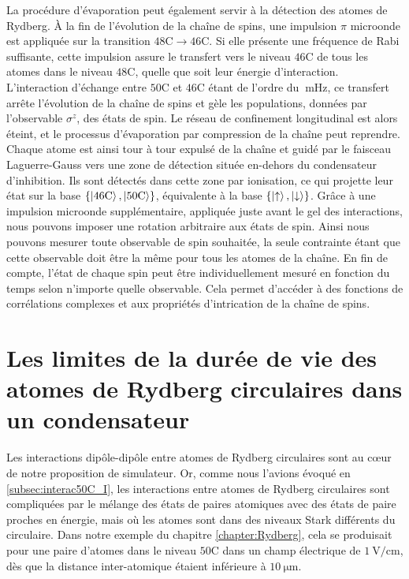 La procédure d'évaporation peut également servir à la détection des atomes de Rydberg.
\`A la fin de l'évolution de la chaîne de spins, une impulsion $\pi$ microonde est appliquée sur la transition $\mathrm{48C}\rightarrow\mathrm{46C}$.
Si elle présente une fréquence de Rabi suffisante, cette impulsion assure le transfert vers le niveau $\mathrm{46C}$ de tous les atomes dans le niveau $\mathrm{48C}$, quelle que soit leur énergie d'interaction.
L'interaction d'échange entre $\mathrm{50C}$ et $\mathrm{46C}$ étant de l'ordre du $\SI{}{\milli\hertz}$, ce transfert arrête l'évolution de la chaîne de spins et \og gèle \fg{} les populations, données par l'observable $\sigma^z$, des états de spin.
Le réseau de confinement longitudinal est alors éteint, et le processus d'évaporation par compression de la chaîne peut reprendre.
Chaque atome est ainsi tour à tour expulsé de la chaîne et guidé par le faisceau Laguerre-Gauss vers une zone de détection située en-dehors du condensateur d'inhibition.
Ils sont détectés dans cette zone par ionisation, ce qui projette leur état sur la base $\{\ket{\mathrm{46C}},\ket{\mathrm{50C}}\}$, équivalente à la base $\{\ket{\uparrow},\ket{\downarrow} \}$.
Grâce à une impulsion microonde supplémentaire, appliquée juste avant le gel des interactions, nous pouvons imposer une rotation arbitraire aux états de spin. Ainsi nous pouvons mesurer toute observable de spin souhaitée, la seule contrainte étant que cette observable doit être la même pour tous les atomes de la chaîne.
En fin de compte, l'état de chaque spin peut être individuellement mesuré en fonction du temps selon n'importe quelle observable.
Cela permet d'accéder à des fonctions de corrélations complexes et aux propriétés d'intrication de la chaîne de spins.

\clearpage
\section{Les limites de la durée de vie des atomes de Rydberg circulaires dans un condensateur}
\noindent Les interactions dipôle-dipôle entre atomes de Rydberg circulaires sont au c\oe ur de notre proposition de simulateur.
Or, comme nous l'avions évoqué en \ref{subsec:interac50C_I}, les interactions entre atomes de Rydberg circulaires sont compliquées par le mélange des états de paires atomiques avec des états de paire proches en énergie, mais où les atomes sont dans des niveaux Stark différents du circulaire.
Dans notre exemple du chapitre \ref{chapter:Rydberg}, cela se produisait pour une paire d'atomes dans le niveau $\mathrm{50C}$ dans un champ électrique de $\SI{1}{\V/\cm}$, dès que la distance inter-atomique étaient inférieure à $\SI{10}{\um}$.


